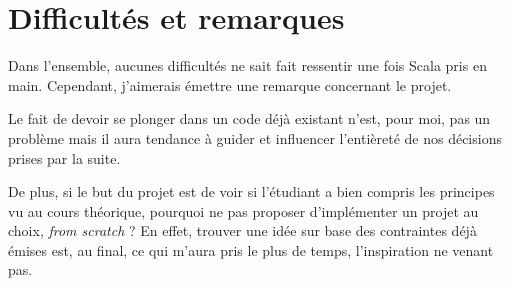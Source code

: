 \section{Difficultés et remarques}
Dans l'ensemble, aucunes difficultés ne sait fait ressentir une fois Scala pris en main. 
Cependant, j'aimerais émettre une remarque concernant le projet. 

Le fait de devoir se plonger dans un code déjà existant n'est, pour moi, pas un problème mais il aura tendance à guider et influencer l'entièreté de nos décisions prises par la suite. 

De plus, si le but du projet est de voir si l'étudiant a bien compris les principes vu au cours théorique, pourquoi ne pas proposer d'implémenter un projet au choix, \textit{from scratch} ? En effet, trouver une idée sur base des contraintes déjà émises est, au final, ce qui m'aura pris le plus de temps, l'inspiration ne venant pas.